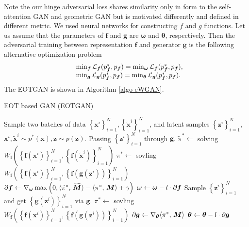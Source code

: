 Note the our hinge adversarial loss shares similarity only in form to the self-attention GAN\cite{2018arXiv180508318Z} and geometric GAN\cite{2017arXiv170502894L} but is motivated differently and defined in different metric. We used neural networks for constructing $f$ and $g$ functions. Let us assume that the parameters of $\bm{f}$ and $\bm{g}$ are $\bm{\omega}$ and $\bm{\theta}$, respectively. Then the adversarial training between representation $\bm{f}$ and
generator $\bm{g}$ is the following alternative optimization problem
\begin{equation}
  \begin{array}{rl}
    &\min_{\bm{f}} \Ll_{\bm{f}}(p^{\ast}_{\bm{f}}, p_{\bm{f}}) = \min_{\bm{\omega}} \Ll_{\bm{f}}(p^{\ast}_{\bm{f}}, p_{\bm{f}}), \\ 
    &\min_{\bm{g}}\Ll_{\bm{g}}(p^{\ast}_{\bm{f}}, p_{\bm{f}}) = \min_{\bm{\th}}\Ll_{\bm{g}}(p^{\ast}_{\bm{f}}, p_{\bm{f}}).
  \end{array}\vspace{-2pt}
\end{equation}
The EOTGAN is shown in Algorithm \ref{algo-eWGAN}.

\begin{algorithm}
  \caption{EOT based GAN (EOTGAN)}\label{algo-eWGAN}
  \begin{algorithmic}[1]
    \STATE Sample two batches of data $ \left\{ \bm{x}^{i}
    \right\}_{i=1}^{N}, \left\{ \tilde{\bm{x}}^{i} \right\}_{i=1}^{N}  $,
    and latent samples $\left\{ \bm{z}^{i} \right\}_{i=1}^{N} $,
    $\bm{x}^{i},\tilde{\bm{x}}^{i} \sim p^{\ast}(\bm{x}), \bm{z}\sim p(\bm{z})$.
    \STATE Passing
    $\left\{ \bm{z}^{i} \right\}_{i=1}^{N}$ through $\bm{g}$.
    \STATE $\widetilde{\pi}^{\ast} \gets$ solving $ W_{\bm{f}}\left( \left\{ \bm{f}(\bm{x}^{i})
      \right\}_{i=1}^{N} , \left\{ \bm{f}(\tilde{\bm{x}}^{i})
      \right\}_{i=1}^{N}\right)$
    \STATE ${\pi}^{\ast} \gets$ sovling $W_{\bm{f}}\left( \left\{ \bm{f}(\bm{x}^{i})
      \right\}_{i=1}^{N}, \left\{ \bm{f}(\bm{g}(\bm{z}^i))
      \right\}_{i=1}^{N} \right)$
    \STATE $\partial{\bm{f}} \gets \nabla_{\bm{\omega}} \max\left(0,  \langle \widetilde{\pi}^{\ast},\,\widetilde{\bm{M}}\rangle-\langle {\pi^{\ast}},\,\bm{M}\rangle+ \gamma\right)$
    \STATE $\bm{\omega} \gets \bm{\omega} - l \cdot \partial{\bm{f}}$
    \STATE Sample $\left\{ \bm{z}^{i} \right\}_{i=1}^{N}$
    and get $ \left\{ \bm{g}(\bm{z}^i)\right\}_{i=1}^{N}$ via $\bm{g}$.
    \STATE $\pi^{\ast} \gets$ sovling $W_{\bm{f}}\left( \left\{ \bm{f}(\bm{x}^{i})
      \right\}_{i=1}^{N}, \left\{ \bm{f}(\bm{g}(\bm{z}^{i}))
      \right\}_{i=1}^{N} \right)$
    \STATE $\partial{\bm{g}} \gets \nabla_{\bm{\theta}} \langle \pi^{\ast},\,\bm{M}\rangle$
    \STATE $\bm{\theta} \gets \bm{\theta} -l \cdot \partial{\bm{g}}$
    \ENDWHILE
  \end{algorithmic}
\end{algorithm}

